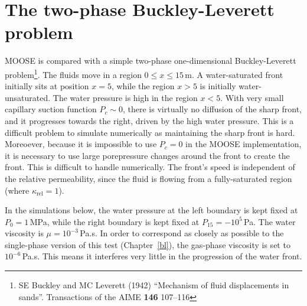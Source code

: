 \documentclass[]{scrreprt}
\begin{document}
\chapter{The two-phase Buckley-Leverett problem}
\label{bl2}

MOOSE is compared with a simple two-phase one-dimensional
Buckley-Leverett problem\footnote{SE Buckley and MC Leverett (1942)
  ``Mechanism of fluid displacements in sands''.  Transactions of the
  AIME {\bf 146} 107--116}.  The fluids move in a region
$0\leq x\leq 15$\,m.  A water-saturated front initially sits at
position $x=5$, while the region $x>5$ is initially water-unsaturated.
The water pressure is high in the region $x<5$.  With very small
capillary suction function $P_{c} \sim 0$, there is virtually no
diffusion of the sharp front, and it progresses towards the right,
driven by the high water pressure.  This is a difficult problem to
simulate numerically as maintaining the sharp front is hard.
Moreoever, because it is impossible to use $P_{c}=0$ in the MOOSE
implementation, it is necessary to use large porepressure changes
around the front to create the front.  This is
difficult to handle numerically.  The front's speed is independent of
the relative permeability, since the fluid is flowing from a
fully-saturated region (where $\kappa_{\mathrm{rel}}=1$).


In the simulations below, the water pressure at the left boundary is
kept fixed at $P_{0}=1$\,MPa, while the right boundary is kept fixed
at $P_{15}=-10^{5}$\,Pa.  The water viscosity is $\mu = 10^{-3}$\,Pa.s.  In
order to correspond as closely as possible to the single-phase version
of this test (Chapter~\ref{bl}), the gas-phase viscosity is set to
$10^{-6}$\,Pa.s.  This means it interferes very little in the
progression of the water front.
\end{document}
